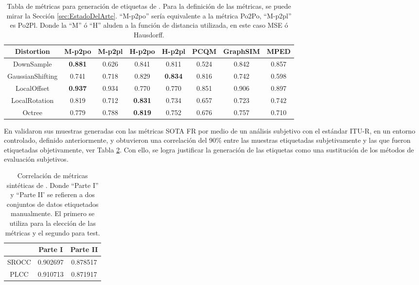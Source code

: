 \begin{table}[htp]
    \scriptsize
    \hspace{-.7cm}
    \begin{tabular}{|c|c|c|c|c|c|c|c|}
    \hline
        \rowcolor[HTML]{FFC702} 
        \textbf{Distortion} & \textbf{M-p2po} & \textbf{M-p2pl} & \textbf{H-p2po} & \textbf{H-p2pl} & \textbf{PCQM} & \textbf{GraphSIM} & \textbf{MPED} \\ \hline
        DownSample & \textbf{0.881} & 0.626 & 0.841 & 0.811 & 0.524 & 0.842 & 0.857 \\ \hline
        GaussianShifting & 0.741 & 0.718 & 0.829 & \textbf{0.834} & 0.816 & 0.742 & 0.598 \\ \hline
        LocalOffset & \textbf{0.937} & 0.934 & 0.770 & 0.770 & 0.851 & 0.906 & 0.897 \\ \hline
        LocalRotation & 0.819 & 0.712 & \textbf{0.831} & 0.734 & 0.657 & 0.723 & 0.742 \\ \hline
        Octree & 0.779 & 0.788 & \textbf{0.819} & 0.752 & 0.676 & 0.757 & 0.710 \\ \hline
    \end{tabular}
    \caption[Tabla de métricas para generación de etiquetas de \cite{ResSCNN}.]{
    Tabla de métricas para generación de etiquetas de \cite{ResSCNN}.
    Para la definición de las métricas, se puede mirar la Sección \ref{sec:EstadoDelArte}.
    ``M-p2po'' sería equivalente a la métrica Po2Po\cite{PointToPoint}, 
    ``M-p2pl'' es Po2Pl\cite{PointToPlane}. 
    Donde la ``M'' ó ``H'' aluden a la función de distancia utilizada, en este caso MSE ó Hausdorff.
  }
    \label{tab:MetricsPerDistortion}
\end{table}

En \cite{ResSCNN} validaron sus muestras generadas con las métricas SOTA FR 
por medio de un análisis subjetivo con el estándar ITU-R, en
un entorno controlado, definido anteriormente, y obtuvieron una correlación del 
90\% entre las muestras 
etiquetadas subjetivamente y las que fueron etiquetadas objetivamente, ver Tabla \ref{tab:PseudoCorr}.
Con ello, se logra justificar la generación de las etiquetas como una sustitución 
de los métodos de evaluación subjetivos. 

\begin{table}[H]
  \centering 
  \scriptsize
  \begin{tabular}{|c|c|c|}
    \hline
    \rowcolor[HTML]{FFC702}
     & \textbf{Parte I} & \textbf{Parte II} \\
    \hline 
    SROCC & 0.902697 & 0.878517\\
    \hline
    PLCC & 0.910713 & 0.871917\\
    \hline
  \end{tabular}
  \caption[Correlación de métricas sintéticas de \cite{ResSCNN}.]{
  Correlación de métricas sintéticas de \cite{ResSCNN}.
  Donde ``Parte I'' y ``Parte II' se refieren a dos conjuntos de datos etiquetados 
  manualmente. El primero se utiliza para la elección de las métricas y el segundo 
  para test.
}
  \label{tab:PseudoCorr}
\end{table}

